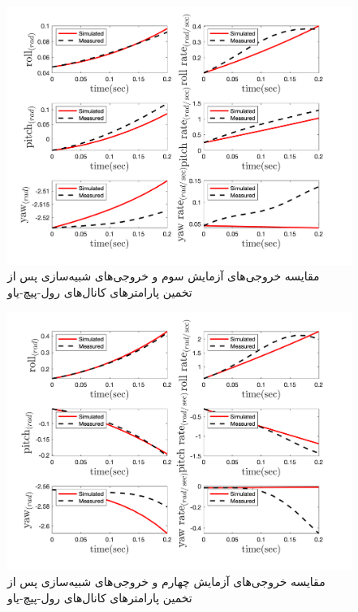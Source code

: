 \begin{figure}[H]
	\includegraphics[width=12cm]{../../Figures/RCP/roll_pitch_yaw_parameter_estimation/RCP_roll_pitch_yaw_S3.png}
	\centering
	\caption{مقايسه خروجی‌های آزمايش سوم و خروجی‌های شبیه‌سازی پس از تخمین پارامترهای کانال‌های رول-پیچ-یاو}
	\label{ roll_pitch_yaw_ps3}
\end{figure}
\begin{figure}[H]
	\includegraphics[width=12cm]{../../Figures/RCP/roll_pitch_yaw_parameter_estimation/RCP_roll_pitch_yaw_S5.png}
	\centering
	\caption{مقايسه خروجی‌های آزمايش چهارم و خروجی‌های شبیه‌سازی پس از تخمین پارامترهای کانال‌های رول-پیچ-یاو}
	\label{ roll_pitch_yaw_ps4}
\end{figure}
